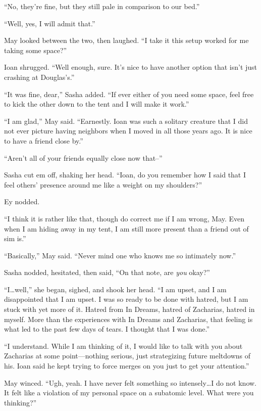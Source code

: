 ``No, they're fine, but they still pale in comparison to our bed.''

``Well, yes, I will admit that.''

May looked between the two, then laughed. ``I take it this setup worked for me taking some space?''

Ioan shrugged. ``Well enough, sure. It's nice to have another option that isn't just crashing at Douglas's.''

``It was fine, dear,'' Sasha added. ``If ever either of you need some space, feel free to kick the other down to the tent and I will make it work.''

``I am glad,'' May said. ``Earnestly. Ioan was such a solitary creature that I did not ever picture having neighbors when I moved in all those years ago. It is nice to have a friend close by.''

``Aren't all of your friends equally close now that--''

Sasha cut em off, shaking her head. ``Ioan, do you remember how I said that I feel others' presence around me like a weight on my shoulders?''

Ey nodded.

``I think it is rather like that, though do correct me if I am wrong, May. Even when I am hiding away in my tent, I am still more present than a friend out of sim is.''

``Basically,'' May said. ``Never mind one who knows me so intimately now.''

Sasha nodded, hesitated, then said, ``On that note, are \emph{you} okay?''

``I\ldots well,'' she began, sighed, and shook her head. ``I am upset, and I am disappointed that I am upset. I was so ready to be done with hatred, but I am stuck with yet more of it. Hatred from In Dreams, hatred of Zacharias, hatred in myself. More than the experiences with In Dreams and Zacharias, that feeling is what led to the past few days of tears. I thought that I was done.''

``I understand. While I am thinking of it, I would like to talk with you about Zacharias at some point—nothing serious, just strategizing future meltdowns of his. Ioan said he kept trying to force merges on you just to get your attention.''

May winced. ``Ugh, yeah. I have never felt something so intensely\ldots I do not know. It felt like a violation of my personal space on a subatomic level. What were you thinking?''


